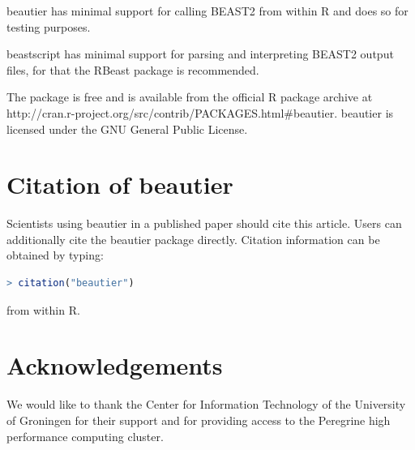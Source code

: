 \documentclass{article}
\begin{document}
beautier has minimal support for calling BEAST2 from within R and does
so for testing purposes. 

beastscript has minimal support for parsing and interpreting BEAST2 output files,
for that the RBeast package is recommended.

The package is free and is available from the official R package archive at 
http://cran.r-project.org/src/contrib/PACKAGES.html\#beautier. 
beautier is licensed under the GNU General Public License.


\section{Citation of beautier}

Scientists using beautier in a published paper should cite this
article. Users can additionally cite the beautier package 
directly. Citation information can be obtained by typing:

\begin{lstlisting}[language=R]
> citation("beautier")
\end{lstlisting}

from within R.

\section*{Acknowledgements}

We would like to thank the Center for Information Technology of the University of Groningen for their support
and for providing access to the Peregrine high performance computing cluster.




\begin{thebibliography}{}

\end{thebibliography}
\end{document}
